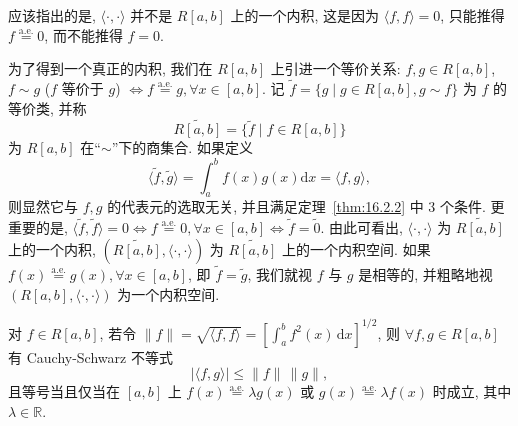 \begin{remark}\label{rem:16.2.3}
应该指出的是, $\langle\cdot,\cdot\rangle$ 并不是 $R[a,b]$ 上的一个内积, 这是因为 $\langle f,f\rangle=0$, 只能推得 $f\overset{\mathrm{a.e.}}{=}0$, 而不能推得 $f=0$.

为了得到一个真正的内积, 我们在 $R[a,b]$ 上引进一个等价关系: $f,g\in R[a,b]$, $f\sim g$ ($f$ 等价于 $g$) $\iff f\overset{\mathrm{a.e.}}{=}g,\forall x\in[a,b]$. 记 $\tilde{f}=\{g\mid g\in R[a,b],g\sim f\}$ 为 $f$ 的等价类, 并称
\[
  \widetilde{R[a,b]}=\{\tilde{f}\mid f\in R[a,b]\}
\]
为 $R[a,b]$ 在``$\sim$''下的商集合. 如果定义
\[
  \langle\tilde{f},\tilde{g}\rangle=\int_{a}^{b}f(x)g(x)\mathrm{d}x=\langle f,g\rangle,
\]
则显然它与 $f, g$ 的代表元的选取无关, 并且满足定理~\ref{thm:16.2.2} 中 3 个条件. 更重要的是, $\langle \tilde{f}, \tilde{f} \rangle = 0 \iff f \overset{\mathrm{a.e.}}{=} 0, \forall x \in [a, b] \iff \tilde{f} = \tilde{0}$. 由此可看出, $\langle\cdot,\cdot\rangle$ 为 $\widetilde{R[a,b]}$ 上的一个内积, $(\widetilde{R[a,b]},\langle\cdot,\cdot\rangle)$ 为 $\widetilde{R[a,b]}$ 上的一个内积空间. 如果 $f(x)\overset{\mathrm{a.e.}}{=}g(x),\forall x\in[a,b]$, 即 $\tilde{f}=\tilde{g}$, 我们就视 $f$ 与 $g$ 是相等的, 并粗略地视 $(R[a,b],\langle\cdot,\cdot\rangle)$ 为一个内积空间.
\end{remark}

\begin{lemma}\label{lem:16.2.1}
对 $f \in R[a, b]$, 若令 $\| f \| = \sqrt{\langle f, f \rangle} = \left[ \int_{a}^{b} f^{2}(x) \, \mathrm{d}x \right]^{1/2}$, 则 $\forall f, g \in R[a, b]$ 有 Cauchy-Schwarz 不等式
\[
  \left|\langle f,g\rangle\right|\leqslant\| f\|\,\| g\|,
\]
且等号当且仅当在 $[a, b]$ 上 $f(x) \overset{\mathrm{a.e.}}{=} \lambda g(x)$ 或 $g(x) \overset{\mathrm{a.e.}}{=} \lambda f(x)$ 时成立, 其中 $\lambda \in \mathbb{R}$.
\end{lemma}

